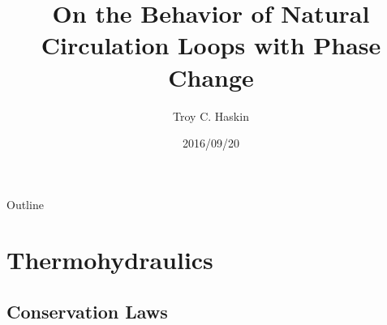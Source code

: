 \documentclass[10pt,t,xcolor=table,compress]{UWMadBeamer}
\title{On the Behavior of Natural Circulation Loops with Phase Change}
\institute{University of Wisconsin--Madison}
\author{Troy C. Haskin}
\date{2016/09/20}
\begin{document}
 

\begin{frame}
    \titlepage
\end{frame}


\begin{frame}{Outline}
    \tableofcontents
\end{frame}








   
\section{Thermohydraulics}

    \subsection*{Conservation Laws}
\end{document}
